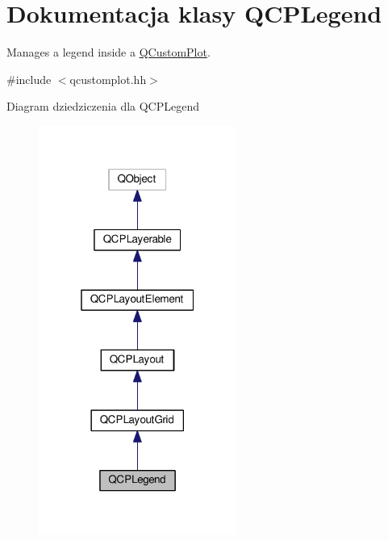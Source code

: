 \hypertarget{class_q_c_p_legend}{}\section{Dokumentacja klasy Q\+C\+P\+Legend}
\label{class_q_c_p_legend}


Manages a legend inside a \hyperlink{class_q_custom_plot}{Q\+Custom\+Plot}.  




{\ttfamily \#include $<$qcustomplot.\+hh$>$}



Diagram dziedziczenia dla Q\+C\+P\+Legend\nopagebreak
\begin{figure}[H]
\begin{center}
\leavevmode
\includegraphics[width=184pt]{class_q_c_p_legend__inherit__graph}
\end{center}
\end{figure}


